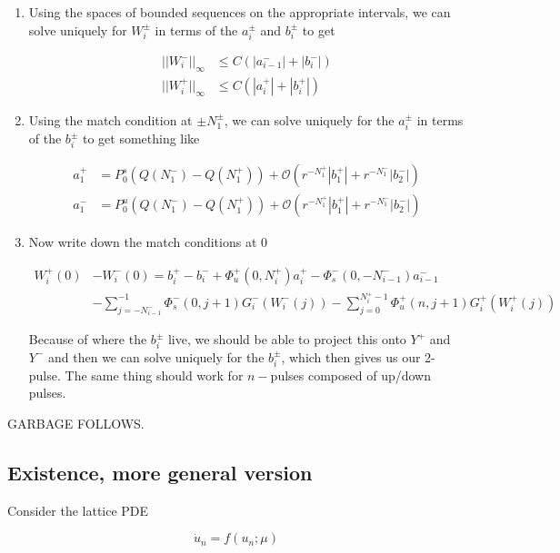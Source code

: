 \documentclass[12pt]{article}
\begin{document}
\begin{enumerate}
\item Using the spaces of bounded sequences on the appropriate intervals, we can solve uniquely for $W_i^\pm$ in terms of the $a_i^\pm$ and $b_i^\pm$ to get

\begin{align*}
||W_i^-||_\infty &\leq C (|a_{i-1}^-| + |b_i^-|) \\
||W_i^+||_\infty &\leq C (|a_i^+| + |b_i^+| )
\end{align*}

\item Using the match condition at $\pm N_1^\pm$, we can solve uniquely for the $a_i^\pm$ in terms of the $b_i^\pm$ to get something like

\begin{align*}
a_1^+ &= P^s_0 \left( Q(N_1^-) - Q(N_1^+) \right) 
+ \mathcal{O}( r^{-N_1^+} |b_1^+| + r^{-N_1^-}|b_2^-| )\\
a_1^- &= P^u_0 \left( Q(N_1^-) - Q(N_1^+) \right) 
+ \mathcal{O}( r^{-N_1^+} |b_1^+| + r^{-N_1^-}|b_2^-| )
\end{align*}

\item Now write down the match conditions at 0

\begin{align*}
W_i^+(0) &- W_i^-(0) = b_i^+ - b_i^- + \Phi_u^+(0, N_i^+) a_i^+ - \Phi_s^-(0, -N_{i-1}^-) a_{i-1}^-  \\
&- \sum_{j = -N_{i-1}^-}^{-1} \Phi_s^-(0, j+1) G_i^-(W_i^-(j)) - \sum_{j = 0}^{N_i^+-1} \Phi_u^+(n, j+1) G_i^+(W_i^+(j))
\end{align*}

Because of where the $b_i^\pm$ live, we should be able to project this onto $Y^+$ and $Y^-$ and then we can solve uniquely for the $b_i^\pm$, which then gives us our 2-pulse. The same thing should work for $n-$pulses composed of up/down pulses.

\end{enumerate}


GARBAGE FOLLOWS.

\subsection{Existence, more general version}

Consider the lattice PDE

\begin{equation}\label{latticePDE}
\dot{u}_n = f(u_n; \mu)
\end{equation}
\end{document}
